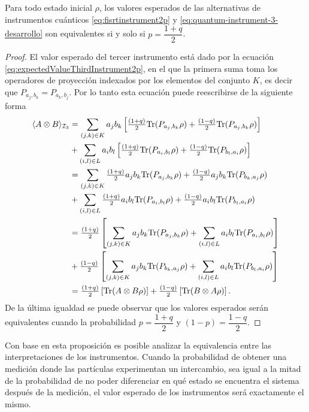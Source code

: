 \begin{proposition}\label{prop:Equivalencia-instruments-1-3}
    Para todo estado inicial $\rho$, los valores esperados de las alternativas de instrumentos cuánticos {\eqref{eq:fisrtinstrument2p}} y {\eqref{eq:quantum-instrument-3-desarrollo}} son equivalentes si y solo si $p=\dfrac{1+q}{2}$.
\end{proposition}


\begin{proof}
El valor esperado del tercer instrumento está dado por la ecuación {\eqref{eq:expectedValueThirdInstrument2p}}, en el que la primera suma toma los operadores de proyección indexados por los elementos del conjunto $K$, es decir que $P_{a_j,b_k}=P_{a_k,b_j}$. Por lo tanto esta ecuación puede reescribirse de la siguiente forma \begin{equation*}
    \begin{split}
        \langle A\otimes B \rangle_{\mathcal{I}_3}&=\sum_{(j,k)\in K} a_j b_k \left[\tfrac{(1+q)}{2} {\rm Tr}(P_{a_j, b_k}\rho)+ \tfrac{(1-q)}{2} {\rm Tr}(P_{a_j, b_k}\rho)\right]\\
        &+\sum_{(i,l)\in L}a_i b_l \left[\tfrac{(1+q)}{2}{\rm Tr}(P_{a_i,b_l}\rho) +\tfrac{(1-q)}{2} {\rm Tr}(P_{b_l, a_i}\rho)\right]\\
        &=\sum_{(j,k)\in K} \tfrac{(1+q)}{2} a_j b_k{\rm Tr}(P_{a_j, b_k}\rho) + \tfrac{(1-q)}{2} a_j b_k {\rm Tr}(P_{ b_k,a_j}\rho)\\
        &+\sum_{(i,l)\in L}\tfrac{(1+q)}{2}a_i b_l {\rm Tr}(P_{a_i,b_l}\rho) +\tfrac{(1-q)}{2}a_i b_l {\rm Tr}(P_{b_l, a_i}\rho)\\
        &=\tfrac{(1+q)}{2}\left[\sum_{(j,k)\in K}  a_j b_k {\rm Tr}(P_{a_j, b_k}\rho)+\sum_{(i,l)\in L}a_i b_l {\rm Tr}(P_{a_i,b_l}\rho)  \right] \\
        &+\tfrac{(1-q)}{2}\left[\sum_{(j,k)\in K}a_j b_k {\rm Tr}(P_{ b_k,a_j}\rho)+\sum_{(i,l) \in L}a_i b_l {\rm Tr}(P_{b_l, a_i}\rho)\right]\\
        &=\tfrac{(1+q)}{2}\left[{\rm Tr}(A\otimes B \rho)  \right] +\tfrac{(1-q)}{2}\left[{\rm Tr}(B\otimes A \rho)\right].\\
    \end{split}
\end{equation*}De la última igualdad se puede observar que los valores esperados serán equivalentes cuando la probabilidad $p=\dfrac{1+q}{2}$ y $(1-p)=\dfrac{1-q}{2}$.
\end{proof}

Con base en esta proposición es posible analizar la equivalencia entre las interpretaciones de los instrumentos. Cuando la probabilidad %
de obtener una medición donde las partículas experimentan un intercambio, sea igual a la mitad de la probabilidad %
 de no poder diferenciar en qué estado se encuentra el sistema después de la medición, el valor esperado de los instrumentos  será exactamente el mismo.   






